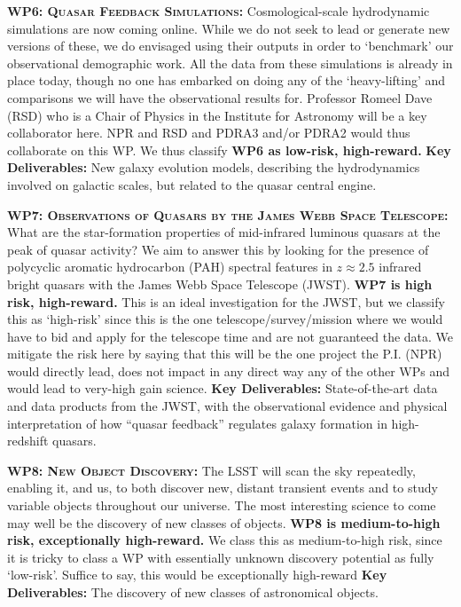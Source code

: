 \documentclass[oneside, a4paper, onecolumn, 11pt]{article}
\begin{document}
\smallskip
\smallskip
\noindent
\textbf{\textsc{WP6: Quasar Feedback Simulations:}} 
Cosmological-scale hydrodynamic simulations are now coming online. 
While we do not seek to lead or generate new versions of these, we do 
envisaged using their outputs in order to `benchmark' our observational 
demographic work. 
All the data from these simulations is already in place today, though no one 
has embarked on doing any of the `heavy-lifting' and comparisons we will 
have the observational results for. Professor Romeel Dave (RSD) who is a Chair of Physics 
in the Institute for Astronomy will be a key collaborator here. 
NPR and RSD and PDRA3 and/or PDRA2 would thus collaborate on this WP. 
We thus classify {\bf WP6 as low-risk, high-reward.}
{\bf Key Deliverables:} New galaxy evolution models, describing the hydrodynamics 
involved on galactic scales, but related to the quasar central engine. 


\smallskip
\smallskip
\noindent
\textbf{\textsc{WP7: Observations of Quasars by the James Webb Space Telescope:}} 
What are the star-formation properties of mid-infrared luminous quasars at the peak of quasar activity? 
We aim to answer this by looking for the presence of polycyclic aromatic hydrocarbon (PAH) spectral features 
in $z \approx 2.5$ infrared bright quasars with the James Webb Space Telescope (JWST). 
{\bf WP7 is high risk, high-reward.}
This is an ideal investigation for the JWST, but we classify this as
`high-risk' since this is the one telescope/survey/mission where we
would have to bid and apply for the telescope time and are not guaranteed
the data. We mitigate the risk here by saying that this will be the
one project the P.I. (NPR) would directly lead, does not impact in any direct way any of
the other WPs and would lead to very-high gain science.
{\bf Key Deliverables:} State-of-the-art data and data products from the JWST, with the observational evidence and physical interpretation of how ``quasar feedback'' regulates galaxy formation in high-redshift quasars. 


\smallskip
\smallskip
\noindent
\textbf{\textsc{WP8: New Object Discovery:}} 
The LSST will scan the sky repeatedly, enabling it, and us, to both
discover new, distant transient events and to study variable objects
throughout our universe. The most interesting science to come may well
be the discovery of new classes of objects.
{\bf WP8 is medium-to-high risk, exceptionally high-reward.}
We class this as medium-to-high risk, since it is tricky to class a WP
with essentially unknown discovery potential as fully `low-risk'.
Suffice to say, this would be exceptionally high-reward
{\bf Key Deliverables:} The discovery of new classes of astronomical objects. 
\end{document}
